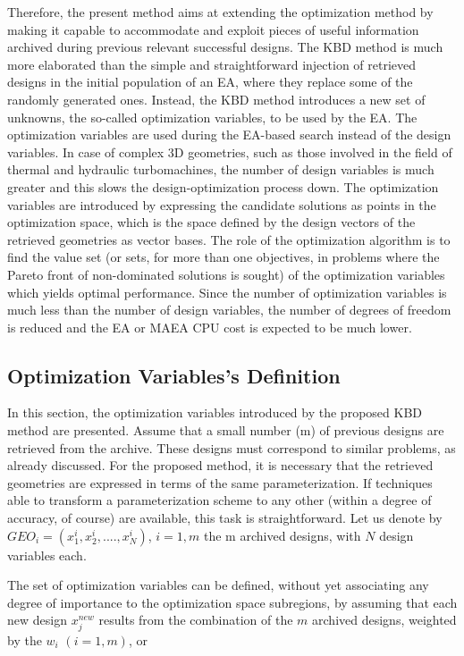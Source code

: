 Therefore, the present method aims at extending the optimization method by making it capable to accommodate and exploit pieces of useful information archived during previous relevant successful designs. The KBD method is much more elaborated than the simple and straightforward injection of retrieved designs in the initial population of an EA, where they replace some of the randomly generated ones. Instead, the KBD method  introduces a new set of unknowns, the so-called optimization variables, to be used by the EA. The optimization variables are used during the EA-based search instead of the design variables. In case of complex 3D geometries, such as those involved in the field of thermal and hydraulic turbomachines, the number of design variables is much greater and this slows the design-optimization process down. The optimization variables are introduced by expressing the candidate solutions as points in the optimization space, which is the space defined by the design vectors of the retrieved geometries as vector bases. The role of the optimization algorithm is to find the value set (or sets, for more than one objectives, in problems where the Pareto front of non-dominated solutions is sought) of the optimization variables which yields optimal performance. Since the number of optimization variables is much less than the number of design variables, the number of degrees of freedom is reduced and the EA or MAEA CPU cost is expected to be much lower.

\subsection{Optimization Variables's Definition}
In this section, the optimization variables introduced by the proposed KBD method are presented. Assume that a small number (m) of previous designs are retrieved from the archive. These designs must correspond to similar problems, as already discussed. For the proposed method, it is necessary  that the retrieved geometries are expressed in terms of the same parameterization. If techniques able to transform a parameterization scheme to any other (within a degree of accuracy, of course) are available, this task is straightforward. Let us denote by $GEO_i=(x_1^i,x_2^i,....,x_N^i)$, $i\!=\!1,m$ the m archived designs, with $N$ design variables each.

The set of optimization variables can be defined, without yet associating any degree of importance to the optimization space subregions, by assuming that each new design $x_j^{new}$ results from the combination of the $m$ archived designs, weighted by the  $w_i$ $(i=1,m)$, or

